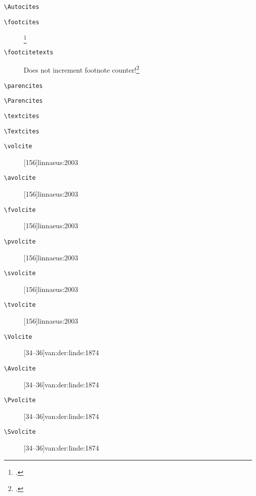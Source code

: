 \documentclass[a4paper,12pt,twoside]{scrartcl}
\newcommand*{\Befehl}[1]{\texttt{\textbackslash#1}}
\begin{document}
\begin{description}
    \item[\Befehl{Autocites}] \Autocites[68]{auler:hiller:2011}[48]{auler:hiller:2015a}[159--187]{auler:hiller:2015}[40--41]{auler:hiller:2016}[15--23]{tacitus:1981}[19]{de:neck:yoder:1978}
	\item[\Befehl{footcites}] \footcites[68]{auler:hiller:2011}[48]{auler:hiller:2015a}[159--187]{auler:hiller:2015}[40--41]{auler:hiller:2016}[15--23]{tacitus:1981}[19]{de:neck:yoder:1978}
	\item[\Befehl{footcitetexts}] Does not increment footnote counter!\footcitetexts[68]{auler:hiller:2011}[48]{auler:hiller:2015a}[159--187]{auler:hiller:2015}[40--41]{auler:hiller:2016}[15--23]{tacitus:1981}[19]{de:neck:yoder:1978}
    \item[\Befehl{parencites}] \parencites[68]{auler:hiller:2011}[48]{auler:hiller:2015a}[159--187]{auler:hiller:2015}[40--41]{auler:hiller:2016}[15--23]{tacitus:1981}[19]{de:neck:yoder:1978}
    \item[\Befehl{Parencites}] \Parencites[68]{auler:hiller:2011}[48]{auler:hiller:2015a}[159--187]{auler:hiller:2015}[40--41]{auler:hiller:2016}[15--23]{tacitus:1981}[19]{de:neck:yoder:1978}
    \item[\Befehl{textcites}] \textcites[68]{auler:hiller:2011}[48]{auler:hiller:2015a}[159--187]{auler:hiller:2015}[40--41]{auler:hiller:2016}[15--23]{tacitus:1981}[19]{de:neck:yoder:1978}
    \item[\Befehl{Textcites}] \Textcites[68]{auler:hiller:2011}[48]{auler:hiller:2015a}[159--187]{auler:hiller:2015}[40--41]{auler:hiller:2016}[15--23]{tacitus:1981}[19]{de:neck:yoder:1978}
	\item[\Befehl{volcite}] [156]{linnaeus:2003}
	\item[\Befehl{avolcite}] [156]{linnaeus:2003}
	\item[\Befehl{fvolcite}] [156]{linnaeus:2003}
	\item[\Befehl{pvolcite}] [156]{linnaeus:2003}
	\item[\Befehl{svolcite}] [156]{linnaeus:2003}
	\item[\Befehl{tvolcite}] [156]{linnaeus:2003}
	\item[\Befehl{Volcite}] [34--36]{van:der:linde:1874}
	\item[\Befehl{Avolcite}] [34--36]{van:der:linde:1874}
	\item[\Befehl{Pvolcite}] [34--36]{van:der:linde:1874}
	\item[\Befehl{Svolcite}] [34--36]{van:der:linde:1874}

\end{description}
\end{document}
